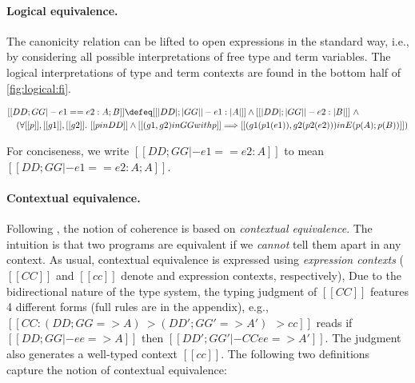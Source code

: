 \paragraph{Logical equivalence.}

The canonicity relation can be lifted to open expressions in the standard way,
i.e., by considering all possible interpretations of free type and term variables.
The logical interpretations of type and term contexts are found in the bottom
half of \cref{fig:logical:fi}.
\begin{definition}
  {\small
  \begin{align*}
    &[[DD ; GG |- e1 == e2 : A ; B]]   \defeq  [[|DD| ; |GG| |- e1 : |A|]] \land [[ |DD | ; |GG| |- e2 : | B | ]] \ \land \\
    &\quad (\forall [[p]], [[g1]], [[g2]]. \ [[p in DD]] \land [[(g1, g2) in GG with p ]] \Longrightarrow [[(g1 (p1 (e1)), g2 (p2 (e2)))  in E (p(A) ; p(B)) ]])
  \end{align*}
  }%
\end{definition}
For conciseness, we write $[[DD ; GG |- e1 == e2 : A]]$ to mean $[[DD ; GG |- e1 == e2 : A ; A]]$.

\paragraph{Contextual equivalence.}


Following \namee, the notion of coherence is based on \emph{contextual
  equivalence}. The intuition is that two programs are equivalent if we
\emph{cannot} tell them apart in any context. As usual, contextual
equivalence is expressed using \emph{expression contexts} ($[[CC]]$ and $[[cc]]$ denote \fnamee and \tnamee expression contexts, respectively),
Due to the bidirectional nature of the type system, the typing judgment of $[[CC]]$
features 4 different forms (full rules are in the appendix),
e.g., $[[CC : (DD; GG => A) ~> (DD'; GG' => A') ~~> cc]]$ reads if $[[DD ; GG |- ee => A]]$
then $[[DD' ; GG' |- CC { ee } => A']]$. The judgment also generates a well-typed \tnamee context $[[cc]]$. The
following two definitions capture the notion of contextual equivalence:

